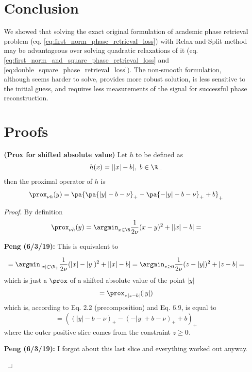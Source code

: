 \documentclass[11pt,letterpaper]{article}
\newcommand{\Peng}[1]{\textbf{Peng (#1):}}
\numberwithin{equation}{section} %
\numberwithin{figure}{section} %
\numberwithin{table}{section} %
\begin{document}
\section{Conclusion}
    We showed that solving the exact original formulation of academic phase retrieval problem (eq. \ref{eq:first_norm_phase_retrieval_loss}) with Relax-and-Split method may be advantageous over solving quadratic relaxations of it (eq. \ref{eq:first_norm_and_square_phase_retrieval_loss} and \ref{eq:double_square_phase_retrieval_loss}). The non-smooth formulation, although seems harder to solve, provides more robust solution, is less sensitive to the initial guess, and requires less measurements of the signal for successful phase reconstruction.        

\appendix
\section{Proofs}
\begin{lemma} \textbf{(Prox for shifted absolute value)}
    \label{lemma:phase_retrieval_prox}
    Let $h$ to be defined as
    \[
        h(x) = ||x|-b|, \ b \in \R_+ 
    \]
    then the proximal operator of $h$ is 
    \[
        \prox_{\nu h}(y) = \pa{\pa{|y| - b - \nu}_+ - \pa{-|y| + b - \nu}_+ + b}_+
    \]
\end{lemma}
\begin{proof}
    By definition 
    \[
        \prox_{\nu h}(y) = \argmin_{x \in \R} \frac{1}{2\nu}(x - y)^2 + ||x|-b| = 
    \]
    \begin{tip}
    \Peng{6/3/19} This is equivalent to
    \end{tip} 
    \[
        = \argmin_{|x| \in \R_+} \frac{1}{2\nu}(|x|-|y|)^2 + ||x| - b| = \argmin_{z \geq 0}\frac{1}{2\nu}(z - |y|)^2 + |z-b| = 
    \]
    which is just a $\prox$ of a shifted absolute value of the point $|y|$
    \[
        = \prox_{\nu|z-b|}(|y|)
    \]
    which is, according to \cite{Parikh2014} Eq. 2.2 (precomposition) and Eq. 6.9, is equal to
    \[
        = ((|y| - b - \nu)_+ - (-|y|+b - \nu)_+ + b)_+
    \]
    where the outer positive slice comes from the constraint $z \geq 0$.
    \begin{tip}
        \Peng{6/3/19} I forgot about this last slice and everything worked out anyway. 
    \end{tip}

\end{proof}
\end{document}
